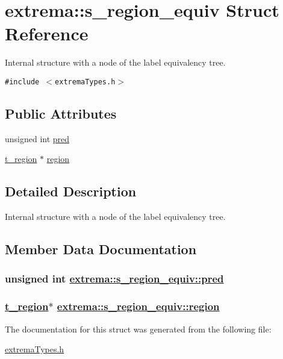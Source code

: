 \hypertarget{structextrema_1_1s__region__equiv}{
\section{extrema::s\_\-region\_\-equiv Struct Reference}
\label{structextrema_1_1s__region__equiv}
}
Internal structure with a node of the label equivalency tree.  


{\tt \#include $<$extrema\-Types.h$>$}

\subsection*{Public Attributes}
\begin{CompactItemize}
\item 
unsigned int \hyperlink{structextrema_1_1s__region__equiv_14eecd471dab5818d031c2d0e4f1a27f}{pred}
\item 
\hyperlink{structextrema_1_1s__region}{t\_\-region} $\ast$ \hyperlink{structextrema_1_1s__region__equiv_10c131fa97c6d7472b7e1d14654c5db7}{region}
\end{CompactItemize}


\subsection{Detailed Description}
Internal structure with a node of the label equivalency tree. 



\subsection{Member Data Documentation}
\hypertarget{structextrema_1_1s__region__equiv_14eecd471dab5818d031c2d0e4f1a27f}{
\subsubsection[pred]{\setlength{\rightskip}{0pt plus 5cm}unsigned int \hyperlink{structextrema_1_1s__region__equiv_14eecd471dab5818d031c2d0e4f1a27f}{extrema::s\_\-region\_\-equiv::pred}}}
\label{structextrema_1_1s__region__equiv_14eecd471dab5818d031c2d0e4f1a27f}


\hypertarget{structextrema_1_1s__region__equiv_10c131fa97c6d7472b7e1d14654c5db7}{
\subsubsection[region]{\setlength{\rightskip}{0pt plus 5cm}\hyperlink{structextrema_1_1s__region}{t\_\-region}$\ast$ \hyperlink{structextrema_1_1s__region__equiv_10c131fa97c6d7472b7e1d14654c5db7}{extrema::s\_\-region\_\-equiv::region}}}
\label{structextrema_1_1s__region__equiv_10c131fa97c6d7472b7e1d14654c5db7}




The documentation for this struct was generated from the following file:\begin{CompactItemize}
\item 
\hyperlink{extremaTypes_8h}{extrema\-Types.h}\end{CompactItemize}
